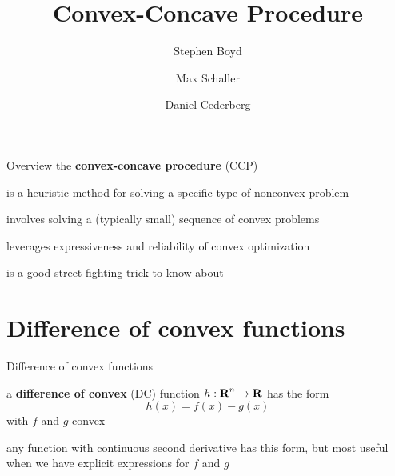 \documentclass[aspectratio=169,11pt]{beamer}
\title{\large \bfseries Convex-Concave Procedure}
\author{Stephen Boyd \and Max Schaller \and Daniel Cederberg}
\begin{document}
\frame{
\thispagestyle{empty}
\titlepage
}

\begin{frame}{Overview}
the \textbf{convex-concave procedure} (CCP)
\BIT
\item is a heuristic method for solving a specific type of 
nonconvex problem
\item involves solving a (typically small) sequence
of convex problems
\item leverages expressiveness and reliability of convex optimization
\item is a good street-fighting trick to know about
\EIT
\end{frame}


\section{Difference of convex functions}

\begin{frame}{Difference of convex functions}

\BIT
\item a \textbf{difference of convex} (DC) function $h:{\mbox{\bfseries\rmfamily R}}^n \to {\mbox{\bfseries\rmfamily R}}$ 
has the form 
\[
h(x)=f(x)-g(x)
\]
with $f$ and $g$ convex
\item any function with continuous second derivative
has this form, but most useful when we have explicit expressions 
for $f$ and $g$
\EIT
\end{frame}
\end{document}
